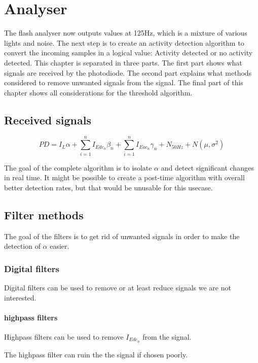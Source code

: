 \chapter{Analyser}
\label{chp:Analyser}
The flash analyser now outputs values at 125Hz, which is a mixture of various lights and noise. The next step is to create an activity detection algorithm to convert the incoming samples in a logical value: Activity detected or no activity detected. This chapter is separated in three parts. The first part shows what signals are received by the photodiode. The second part explains what methods considered to remove unwanted signals from the signal. The final part of this chapter shows all considerations for the threshold algorithm.

\section{Received signals}

\begin{equation}
\label{eq:Pd_light}
PD = I_{L} \alpha + \sum_{i=1}^n I_{Edc_{n}} \beta_{n} + \sum_{i=1}^n I_{Eac{_n}} \gamma_{n} + N_{50Hz} + N(\mu,\sigma^2)
\end{equation}

The goal of the complete algorithm is to isolate $\alpha$ and detect significant changes in real time. It might be possible to create a post-time algorithm with overall better detection rates, but that would be unusable for this usecase.

\section{Filter methods}
The goal of the filters is to get rid of unwanted signals in order to make the detection of $\alpha$ easier.

\subsection{Digital filters}
Digital filters can be used to remove or at least reduce signals we are not interested.

\subsubsection{highpass filters}
Highpass filters can be used to remove $I_{Edc_{n}}$ from the signal.

The highpass filter can ruin the the signal if chosen poorly.

